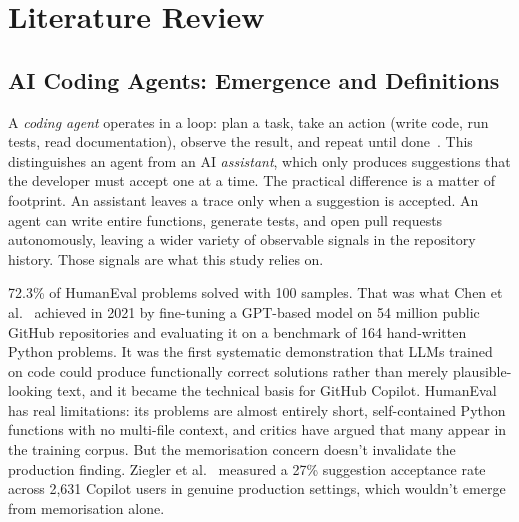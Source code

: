 
\chapter{Literature Review}
\label{chap:litrev}

\section{AI Coding Agents: Emergence and Definitions}
\label{sec:lr:agents}

A \emph{coding agent} operates in a loop: plan a task, take an action (write code, run tests, read documentation), observe the result, and repeat until done~\cite{robbesAgenticMuch2026}. This distinguishes an agent from an AI \emph{assistant}, which only produces suggestions that the developer must accept one at a time. The practical difference is a matter of footprint. An assistant leaves a trace only when a suggestion is accepted. An agent can write entire functions, generate tests, and open pull requests autonomously, leaving a wider variety of observable signals in the repository history. Those signals are what this study relies on.

72.3\% of HumanEval problems solved with 100 samples. That was what Chen et al.~\cite{chen2021codex} achieved in 2021 by fine-tuning a GPT-based model on 54 million public GitHub repositories and evaluating it on a benchmark of 164 hand-written Python problems. It was the first systematic demonstration that LLMs trained on code could produce functionally correct solutions rather than merely plausible-looking text, and it became the technical basis for GitHub Copilot. HumanEval has real limitations: its problems are almost entirely short, self-contained Python functions with no multi-file context, and critics have argued that many appear in the training corpus. But the memorisation concern doesn't invalidate the production finding. Ziegler et al.~\cite{ziegler2022} measured a 27\% suggestion acceptance rate across 2,631 Copilot users in genuine production settings, which wouldn't emerge from memorisation alone.

